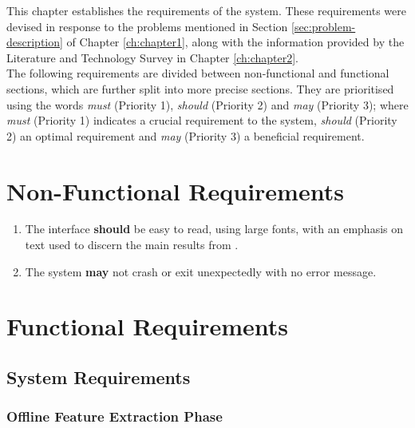 This chapter establishes the requirements of the system. These requirements were devised in response to the problems mentioned in Section \ref{sec:problem-description} of Chapter \ref{ch:chapter1}, along with the information provided by the Literature and Technology Survey in Chapter \ref{ch:chapter2}.\\

The following requirements are divided between non-functional and functional sections, which are further split into more precise sections. They are prioritised using the words \textit{must} (Priority 1), \textit{should} (Priority 2) and \textit{may} (Priority 3); where \textit{must} (Priority 1) indicates a crucial requirement to the system, \textit{should} (Priority 2) an optimal requirement and \textit{may} (Priority 3) a beneficial requirement.

\section{Non-Functional Requirements}

\begin{enumerate}
    \item The interface \textbf{should} be easy to read, using large fonts, with an emphasis on text used to discern the main results from .
    \item The system \textbf{may} not crash or exit unexpectedly with no error message.
\end{enumerate}

\section{Functional Requirements}

\subsection{System Requirements}

\subsubsection{Offline Feature Extraction Phase}

